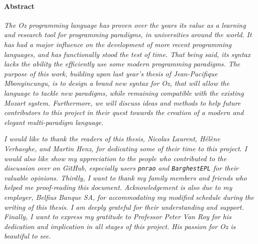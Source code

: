 \paragraph{Abstract}
\textit{
The \textit{Oz} programming language has proven over the years its value as a learning and research tool for programming paradigms, in universities around the world.
It has had a major influence on the development of more recent programming languages, and has functionally stood the test of time.
That being said, its syntax lacks the ability the efficiently use some modern programming paradigms.
The purpose of this work, building upon last year's thesis of Jean-Pacifique Mbonyincungu, is to design a brand new syntax for \textit{Oz}, that will allow the language to tackle new paradigms, while remaining compatible with the existing Mozart system.
Furthermore, we will discuss ideas and methods to help future contributors to this project in their quest towards the creation of a modern and elegant multi-paradigm language.
}\newline\newline

\textit{
I would like to thank the readers of this thesis, Nicolas Laurent, Hélène Verhaeghe, and Martin Henz, for dedicating some of their time to this project.\newline
I would also like show my appreciation to the people who contributed to the discussion over on \emph{GitHub}, especially users \texttt{pnrao} and \texttt{BarghestEPL} for their valuable opinions.\newline
Thirdly, I want to thank my family members and friends who helped me proof-reading this document.\newline\newline
Acknowledgement is also due to my employer, \emph{Belfius Banque SA}, for accommodating my modified schedule during the writing of this thesis. I am deeply grateful for their understanding and support.\newline
Finally, I want to express my gratitude to Professor Peter Van Roy for his dedication and implication in all stages of this project. His passion for \emph{Oz} is beautiful to see.
}